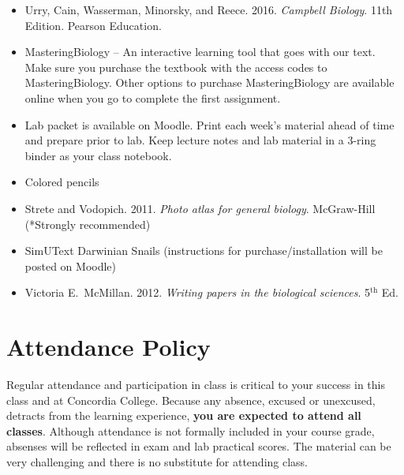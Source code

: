 \documentclass{tufte-handout}
\begin{document}
\begin{fullwidth}
\begin{itemize}
	\item Urry, Cain, Wasserman, Minorsky, and Reece. 2016. \emph{Campbell Biology}. 11th Edition. Pearson Education.
	\item MasteringBiology -- An interactive learning tool that goes with our text. Make sure you purchase the textbook with the access codes to MasteringBiology. Other options to purchase MasteringBiology are available online when you go to complete the first assignment.
	\item Lab packet is available on Moodle. Print each week's material ahead of time and prepare prior to lab. Keep lecture notes and lab material in a 3-ring binder as your class notebook. 
	\item Colored pencils
	\item Strete and Vodopich. 2011. \emph{Photo atlas for general biology}. McGraw-Hill (*Strongly recommended)
	\item SimUText Darwinian Snails (instructions for purchase/installation will be posted on Moodle)
	\item Victoria E.\ McMillan. 2012. \emph{Writing papers in the biological sciences}. 5$^\mathrm{th}$ Ed.
\end{itemize}

\section{Attendance Policy}

Regular attendance and participation in class is critical to your success in this class and at Concordia College. Because any absence, excused or unexcused, detracts from the learning experience, \textbf{you are expected to attend all classes}. Although attendance is not formally included in your course grade, absenses will be reflected in exam and lab practical scores. The material can be very challenging and there is no substitute for attending class. 





\end{fullwidth}
\end{document}
